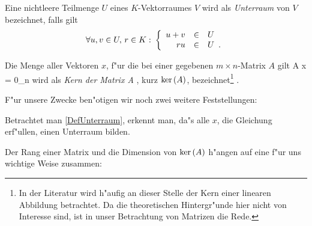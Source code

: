 \MyBeginDef
\label{DefUnterraum}
    Eine nichtleere Teilmenge $U$ eines $K$-Vektorraumes $V$ wird als 
    {\em Unterraum}  von $V$ bezeichnet, falls gilt
    \[
        \forall u,v \in U, \, r \in K : \: 
        \left\{
            \begin{array}{rcl}
                u + v & \in & U \\
                r u & \in & U \mbox{\hspace{0.5em}.} 
            \end{array}
        \right.
    \]
\MyEndDef

\MyBeginDef
\label{DefKern}
    Die Menge aller Vektoren $x$,
    f"ur die bei einer gegebenen $m \times n$-Matrix $A$ gilt
        A x = 0_n
    \Eeq
    wird als {\em Kern der Matrix A} , kurz $\mbox{\rm ker} \,(A)$,
    bezeichnet\footnote{ In der Literatur wird h"aufig an dieser
    Stelle der Kern einer linearen Abbildung betrachtet. Da die 
    theoretischen Hintergr"unde hier nicht von Interesse sind, ist in
    unser Betrachtung von Matrizen die Rede.} .
\MyEndDef

F"ur unsere Zwecke ben"otigen wir noch zwei weitere Feststellungen:

\begin{bemerkung}
\label{SatzKernUnterraum}
    Betrachtet man \ref{DefUnterraum}, erkennt man,
    da"s alle $x$, die Gleichung  er\-f"ul\-len,
    einen Unterraum bilden.
\end{bemerkung}

Der Rang einer Matrix und die Dimension von $\mbox{\rm ker} \,(A)$ h"angen auf
eine f"ur uns wichtige Weise zusammen:

